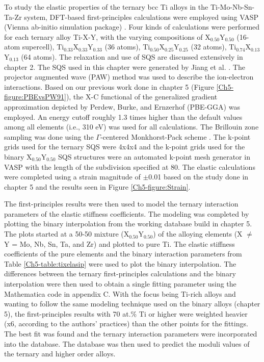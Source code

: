 To study the elastic properties of the ternary bcc Ti alloys in the Ti-Mo-Nb-Sn-Ta-Zr system, DFT-based first-principles calculations were employed using VASP (Vienna ab-initio simulation package) \cite{Kresse1996,Kresse1999}. Four kinds of calculations were performed for each ternary alloy Ti-X-Y, with the varying compositions of X$_{0.50}$Y$_{0.50}$ (16-atom supercell), Ti$_{0.33}$X$_{0.33}$Y$_{0.33}$ (36 atoms), Ti$_{0.50}$X$_{0.25}$Y$_{0.25}$ (32 atoms), Ti$_{0.74}$X$_{0.13}$Y$_{0.13}$ (64 atoms). The relaxation and use of SQS are discussed extensively in chapter 2. The SQS used in this chapter were generated by Jiang et al. \cite{Jiang2004,Jiang2009}. The projector augmented wave (PAW) method was used to describe the ion-electron interactions. Based on our previous work done in chapter 5 (Figure \ref{Ch5-figure:PBEvsPW91}), the X-C functional of the generalized gradient approximation depicted by Perdew, Burke, and Ernzerhof (PBE-GGA) \cite{Perdew1996a} was employed. An energy cutoff roughly 1.3 times higher than the default values among all elements (i.e., 310 eV) was used for all calculations. The Brillouin zone sampling was done using the $\Gamma$-centered Monkhorst-Pack scheme \cite{Monkhorst1976a}. The k-point grids used for the ternary SQS were 4x4x4 and the k-point grids used for the binary X$_{0.50}$Y$_{0.50}$ SQS structures were an automated k-point mesh generator in VASP with the length of the subdivision specified at 80. The elastic calculations were completed using a strain magnitude of $\pm$0.01 based on the study done in chapter 5 and the results seen in Figure \ref{Ch5-figure:Strain}.

The first-principles results were then used to model the ternary interaction parameters of the elastic stiffness coefficients. The modeling was completed by plotting the binary interpolation from the working database build in chapter 5. The plots started at a 50-50 mixture (X$_{0.50}$Y$_{0.50}$) of the alloying elements (X $\neq$ Y = Mo, Nb, Sn, Ta, and Zr) and plotted to pure Ti. The elastic stiffness coefficients of the pure elements and the binary interaction parameters from Table \ref{Ch5-table:tixelasip} were used to plot the binary interpolation. The differences between the ternary first-principles calculations and the binary interpolation were then used to obtain a single fitting parameter using the Mathematica code in appendix C. With the focus being Ti-rich alloys and wanting to follow the same modeling technique used on the binary alloys (chapter 5), the first-principles results with 70 at.\% Ti or higher were weighted heavier (x6, according to the authors' practices) than the other points for the fittings. The best fit was found and the ternary interaction parameters were incorporated into the database. The database was then used to predict the moduli values of the ternary and higher order alloys. 

